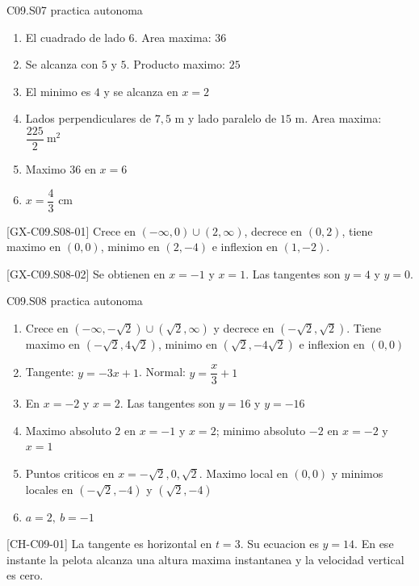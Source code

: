 \begin{shortanswer}{C09.S07 practica autonoma}
\begin{enumerate}[label=\textbf{PX-C09.S07-\arabic*:}, leftmargin=*]
  \item El cuadrado de lado \(6\). Area maxima: \(36\)
  \item Se alcanza con \(5\) y \(5\). Producto maximo: \(25\)
  \item El minimo es \(4\) y se alcanza en \(x=2\)
  \item Lados perpendiculares de \(7{,}5\) m y lado paralelo de \(15\) m. Area maxima:
  \(\dfrac{225}{2}\ \text{m}^2\)
  \item Maximo \(36\) en \(x=6\)
  \item \(x=\dfrac{4}{3}\) cm
\end{enumerate}
\end{shortanswer}

\begin{shortanswer}{[GX-C09.S08-01]}
Crece en \((-\infty,0)\cup(2,\infty)\), decrece en \((0,2)\), tiene maximo en \((0,0)\),
minimo en \((2,-4)\) e inflexion en \((1,-2)\).
\end{shortanswer}

\begin{shortanswer}{[GX-C09.S08-02]}
Se obtienen en \(x=-1\) y \(x=1\). Las tangentes son \(y=4\) y \(y=0\).
\end{shortanswer}

\begin{shortanswer}{C09.S08 practica autonoma}
\begin{enumerate}[label=\textbf{PX-C09.S08-\arabic*:}, leftmargin=*]
  \item Crece en \((-\infty,-\sqrt{2})\cup(\sqrt{2},\infty)\) y decrece en
  \((-\sqrt{2},\sqrt{2})\). Tiene maximo en \((-\sqrt{2},4\sqrt{2})\),
  minimo en \((\sqrt{2},-4\sqrt{2})\) e inflexion en \((0,0)\)
  \item Tangente: \(y=-3x+1\). Normal: \(y=\dfrac{x}{3}+1\)
  \item En \(x=-2\) y \(x=2\). Las tangentes son \(y=16\) y \(y=-16\)
  \item Maximo absoluto \(2\) en \(x=-1\) y \(x=2\); minimo absoluto \(-2\) en \(x=-2\) y
  \(x=1\)
  \item Puntos criticos en \(x=-\sqrt{2},0,\sqrt{2}\). Maximo local en \((0,0)\) y minimos
  locales en \((-\sqrt{2},-4)\) y \((\sqrt{2},-4)\)
  \item \(a=2,\ b=-1\)
\end{enumerate}
\end{shortanswer}

\begin{shortanswer}{[CH-C09-01]}
La tangente es horizontal en \(t=3\). Su ecuacion es \(y=14\). En ese instante la pelota
alcanza una altura maxima instantanea y la velocidad vertical es cero.
\end{shortanswer}
